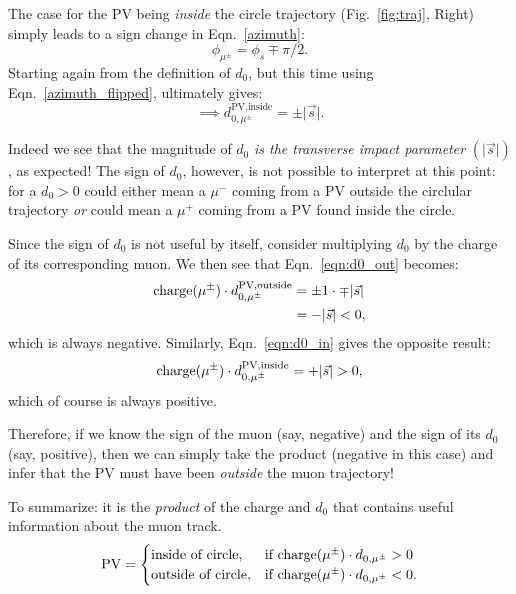 The case for the PV being {\it inside} the circle trajectory (Fig.~\ref{fig:traj}, Right) simply leads to a sign change in Eqn.~\ref{azimuth}:
\begin{equation}
    \label{azimuth_flipped}
\phi_{\mu^{\pm}} = \phi_{s} \mp \pi/2.
\end{equation}
Starting again from the definition of $d_0$, but this time using Eqn.~\ref{azimuth_flipped}, ultimately gives:
\begin{equation}
    \label{eqn:d0_in}
\implies  d_{0,\mu^{\pm}}^{\text{PV,inside}} = \pm \lvert \vec{s} \rvert.
\end{equation}

Indeed we see that the magnitude of $d_0$ {\it is the transverse impact parameter} $(\lvert \vec{s} \rvert)$, as expected!
The sign of $d_0$, however, is not possible to interpret at this point: 
for a $d_0 > 0$ could either mean a $\mu^-$ coming from a PV outside the circlular trajectory \emph{or}
could mean a $\mu^+$ coming from a PV found inside the circle.

Since the sign of $d_0$ is not useful by itself, consider multiplying $d_0$ by the charge of its corresponding muon. 
We then see that Eqn.~\ref{eqn:d0_out} becomes:
\begin{align*}
    {\rm charge}(\mu^{\pm}) \cdot d_{0,\mu^{\pm}}^{\text{PV,outside}} &= \pm1 \cdot \mp \lvert \vec{s} \rvert \\
    &= - \lvert \vec{s} \rvert < 0,
\end{align*}
which is always negative. Similarly, Eqn.~\ref{eqn:d0_in} gives the opposite result:
\begin{equation*}
    {\rm charge}(\mu^{\pm}) \cdot d_{0,\mu^{\pm}}^{\text{PV,inside}} = + \lvert \vec{s} \rvert > 0,
\end{equation*}
which of course is always positive. 

Therefore, if we know the sign of the muon (say, negative) 
and the sign of its $d_0$ (say, positive), 
then we can simply take the product (negative in this case) 
and infer that the PV must have been \emph{outside} the muon trajectory!

To summarize: it is the \emph{product} of the charge and $d_0$ that contains useful information about the muon track. 
\[
    {\rm PV} = 
\begin{cases}
    \text{inside of circle},& \text{if charge}(\mu^{\pm}) \cdot d_{0,\mu^{\pm}} > 0 \\
    \text{outside of circle},& \text{if charge}(\mu^{\pm}) \cdot d_{0,\mu^{\pm}} < 0.
\end{cases}
\]
% 

